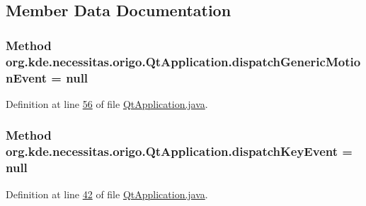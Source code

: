 \subsection{Member Data Documentation}
\hypertarget{classorg_1_1kde_1_1necessitas_1_1origo_1_1_qt_application_a3cbf08100c28cac6537d5f2692d5294c}{
\subsubsection[{dispatch\-Generic\-Motion\-Event}]{\setlength{\rightskip}{0pt plus 5cm}Method org.\-kde.\-necessitas.\-origo.\-Qt\-Application.\-dispatch\-Generic\-Motion\-Event = null\hspace{0.3cm}{\ttfamily [static]}}}\label{d0/da0/classorg_1_1kde_1_1necessitas_1_1origo_1_1_qt_application_a3cbf08100c28cac6537d5f2692d5294c}


Definition at line \hyperlink{_qt_application_8java_source_l00056}{56} of file \hyperlink{_qt_application_8java_source}{Qt\-Application.\-java}.

\hypertarget{classorg_1_1kde_1_1necessitas_1_1origo_1_1_qt_application_aab936e36af61fbebae2ba7f3d18f54d7}{
\subsubsection[{dispatch\-Key\-Event}]{\setlength{\rightskip}{0pt plus 5cm}Method org.\-kde.\-necessitas.\-origo.\-Qt\-Application.\-dispatch\-Key\-Event = null\hspace{0.3cm}{\ttfamily [static]}}}\label{d0/da0/classorg_1_1kde_1_1necessitas_1_1origo_1_1_qt_application_aab936e36af61fbebae2ba7f3d18f54d7}


Definition at line \hyperlink{_qt_application_8java_source_l00042}{42} of file \hyperlink{_qt_application_8java_source}{Qt\-Application.\-java}.

